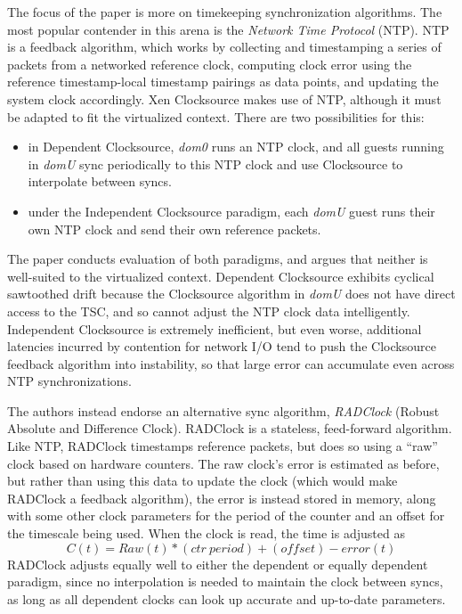 \documentclass[letterpaper, twocolumn]{article}
\begin{document}
The focus of the paper is more on timekeeping synchronization algorithms.
The most popular contender in this arena is the \emph{Network Time Protocol} (NTP).
NTP is a feedback algorithm, which works by collecting and timestamping a series
of packets from a networked reference clock, computing clock error using
the reference timestamp-local timestamp pairings as data points, 
and updating the system clock accordingly.  Xen Clocksource makes use of NTP,
although it must be adapted to fit the virtualized context.  There are two
possibilities for this:
\begin{itemize}
\item in Dependent Clocksource, \emph{dom0} runs an NTP
clock, and all guests running in \emph{domU} sync periodically to this NTP
clock and use Clocksource to interpolate between syncs.  
\item under the Independent Clocksource paradigm, each \emph{domU} guest runs their own
NTP clock and send their own reference packets.
\end{itemize}
The paper conducts evaluation of both paradigms, and argues
that neither is well-suited to the virtualized context.  Dependent Clocksource
exhibits cyclical sawtoothed drift because the Clocksource algorithm in
\emph{domU} does not have direct access to the TSC, and so cannot adjust
the NTP clock data intelligently.  Independent Clocksource is extremely
inefficient, but even worse, additional latencies incurred by contention for
network I/O tend to push the Clocksource feedback algorithm into instability,
so that large error can accumulate even across NTP synchronizations.

The authors instead endorse an alternative sync algorithm, \emph{RADClock}
(Robust Absolute and Difference Clock).  RADClock is a stateless, feed-forward
algorithm.  Like NTP, RADClock timestamps reference packets, but does so using
a ``raw'' clock based on hardware counters.  The raw clock's error is estimated
as before, but rather than using this data to update the clock (which would make
RADClock a feedback algorithm), the error is instead stored in memory, along
with some other clock parameters for the period of the counter and an offset
for the timescale being used.  When the clock is read, the time is adjusted
as
\[
	C(t) = Raw(t) * (ctr~period) + (offset) - error(t)
\]
RADClock adjusts equally well to either the dependent or equally dependent paradigm,
since no interpolation is needed to maintain the clock between syncs, as long
as all dependent clocks can look up accurate and up-to-date parameters.
\end{document}

